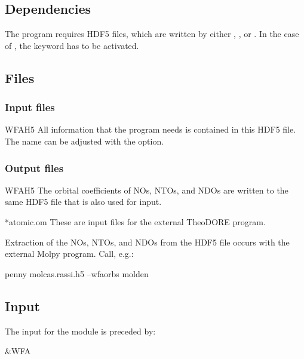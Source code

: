 \subsection{Dependencies}
\label{UG:sec:wfa_dependencies}
The  program requires HDF5 files, which are written by either
, , or . In the case of ,
the   keyword has to be activated.

\subsection{Files}
\label{UG:sec:wfa_files}

\subsubsection{Input files}
\begin{filelist}
\item[WFAH5]
All information that the  program needs is contained in this HDF5 file.
The name can be adjusted with the  option.
\end{filelist}

\subsubsection{Output files}

\begin{filelist}
\item[WFAH5]
The orbital coefficients of NOs, NTOs, and NDOs are written to the same HDF5 file that
is also used for input.
\item[*atomic.om]
These are input files for the external TheoDORE program.
\end{filelist}

Extraction of the NOs, NTOs, and NDOs from the HDF5 file occurs with the external Molpy program. Call, e.g.:

\begin{inputlisting}
penny molcas.rassi.h5 --wfaorbs molden
\end{inputlisting}

\subsection{Input}
\label{UG:sec:wfa_input}

The input for the  module is preceded by:
\begin{inputlisting}
 &WFA
\end{inputlisting}

